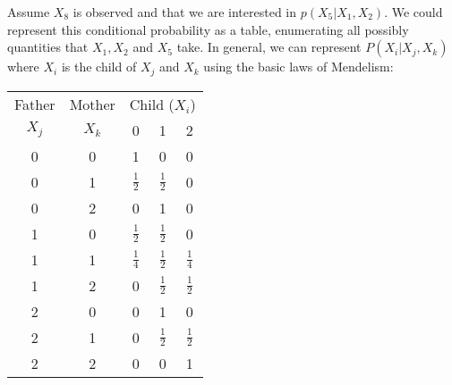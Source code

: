 \documentclass[12pt]{report}
\begin{document}
\begin{center}
\end{center}

Assume $X_8$ is observed and that we are interested in
$p(X_5|X_1,X_2)$. We could represent this conditional probability as a
table, enumerating all possibly quantities that $X_1,X_2$ and $X_5$
take. In general, we can represent $P(X_i | X_j,X_k)$ where $X_i$ is
the child of $X_j$ and $X_k$ using the basic laws of Mendelism:
\begin{center}
\begin{tabular}{|c c|c c c|}
\hline
Father & Mother & \multicolumn{3}{c|}{Child ($X_i$)} \\
$X_j$ & $X_k$ &           0 &           1 &           2 \\
\hline
0     & 0     &           1 &           0 &           0 \\
0     & 1     & $\frac{1}{2}$ & $\frac{1}{2}$ &           0 \\
0     & 2     &           0 &           1 &           0 \\
1     & 0     & $\frac{1}{2}$ & $\frac{1}{2}$ &           0 \\
1     & 1     & $\frac{1}{4}$ & $\frac{1}{2}$ & $\frac{1}{4}$ \\
1     & 2     &           0 & $\frac{1}{2}$ & $\frac{1}{2}$ \\
2     & 0     &           0 &           1 &           0 \\
2     & 1     &           0 & $\frac{1}{2}$ & $\frac{1}{2}$ \\
2     & 2     &           0 &           0 &           1 \\
\hline
\end{tabular}
\end{center}
\end{document}
